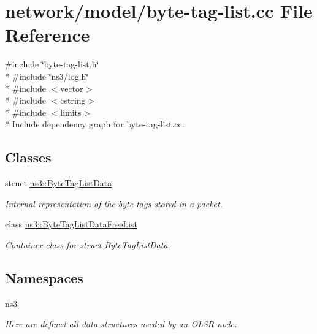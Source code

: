 \hypertarget{byte-tag-list_8cc}{}\section{network/model/byte-\/tag-\/list.cc File Reference}
\label{byte-tag-list_8cc}
{\ttfamily \#include \char`\"{}byte-\/tag-\/list.\+h\char`\"{}}\\*
{\ttfamily \#include \char`\"{}ns3/log.\+h\char`\"{}}\\*
{\ttfamily \#include $<$vector$>$}\\*
{\ttfamily \#include $<$cstring$>$}\\*
{\ttfamily \#include $<$limits$>$}\\*
Include dependency graph for byte-\/tag-\/list.cc\+:
\subsection*{Classes}
\begin{DoxyCompactItemize}
\item 
struct \hyperlink{structns3_1_1ByteTagListData}{ns3\+::\+Byte\+Tag\+List\+Data}
\begin{DoxyCompactList}\small\item\em Internal representation of the byte tags stored in a packet. \end{DoxyCompactList}\item 
class \hyperlink{classns3_1_1ByteTagListDataFreeList}{ns3\+::\+Byte\+Tag\+List\+Data\+Free\+List}
\begin{DoxyCompactList}\small\item\em Container class for struct \hyperlink{structns3_1_1ByteTagListData}{Byte\+Tag\+List\+Data}. \end{DoxyCompactList}\end{DoxyCompactItemize}
\subsection*{Namespaces}
\begin{DoxyCompactItemize}
\item 
 \hyperlink{namespacens3}{ns3}
\begin{DoxyCompactList}\small\item\em Here are defined all data structures needed by an O\+L\+SR node. \end{DoxyCompactList}\end{DoxyCompactItemize}
